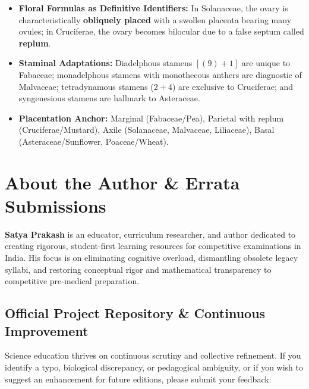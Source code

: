 \documentclass[10pt,twoside,openright]{book}
\begin{document}
\begin{ncertbox}
\begin{itemize}[leftmargin=*]
  \item \textbf{Floral Formulas as Definitive Identifiers:} In Solanaceae, the ovary is characteristically \textbf{obliquely placed} with a swollen placenta bearing many ovules; in Cruciferae, the ovary becomes bilocular due to a false septum called \textbf{replum}.
  \item \textbf{Staminal Adaptations:} Diadelphous stamens $[(9)+1]$ are unique to Fabaceae; monadelphous stamens with monothecous anthers are diagnostic of Malvaceae; tetradynamous stamens ($2+4$) are exclusive to Cruciferae; and syngenesious stamens are hallmark to Asteraceae.
  \item \textbf{Placentation Anchor:} Marginal (Fabaceae/Pea), Parietal with replum (Cruciferae/Mustard), Axile (Solanaceae, Malvaceae, Liliaceae), Basal (Asteraceae/Sunflower, Poaceae/Wheat).
\end{itemize}
\end{ncertbox}

\backmatter

\chapter*{About the Author \& Errata Submissions}

\textbf{Satya Prakash} is an educator, curriculum researcher, and author dedicated to creating rigorous, student-first learning resources for competitive examinations in India. His focus is on eliminating cognitive overload, dismantling obsolete legacy syllabi, and restoring conceptual rigor and mathematical transparency to competitive pre-medical preparation.

\section*{Official Project Repository \& Continuous Improvement}

Science education thrives on continuous scrutiny and collective refinement. If you identify a typo, biological discrepancy, or pedagogical ambiguity, or if you wish to suggest an enhancement for future editions, please submit your feedback:
\end{document}
